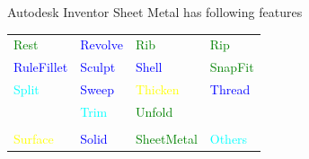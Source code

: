 \begin{frame}{Autodesk Inventor Sheet Metal has following features}
\begin{table}[!h]
\begin{tabular}[h]{@{}l l l l @{}}
\textcolor{green}{Rest} &
\textcolor{blue}{Revolve} &
\textcolor{green}{Rib} &
\textcolor{green}{Rip} \\

\textcolor{blue}{RuleFillet} &
\textcolor{blue}{Sculpt} &
\textcolor{blue}{Shell} &
\textcolor{green}{SnapFit} \\

\textcolor{cyan}{Split} &
\textcolor{blue}{Sweep} &
\textcolor{yellow}{Thicken} &
\textcolor{blue}{Thread} \\

&\textcolor{cyan}{Trim} &
\textcolor{green}{Unfold} &\\
\\
\textcolor{yellow}{Surface} &
\textcolor{blue}{Solid} &
\textcolor{green}{SheetMetal} &
\textcolor{cyan}{Others}\\

\end{tabular}
\end{table}

\end{frame}

